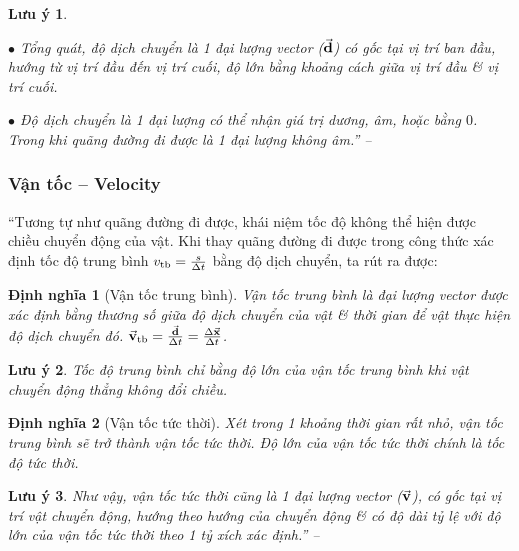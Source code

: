 \documentclass[oneside]{book}
\numberwithin{equation}{section}
\newtheorem{dinhnghia}{Định nghĩa}[section]
\newtheorem{luuy}{Lưu ý}[section]
\begin{document}
\begin{luuy}
	\begin{enumerate*}
		\item[$\bullet$] Tổng quát, độ dịch chuyển là 1 đại lượng vector ($\vec{\bf d}$) có gốc tại vị trí ban đầu, hướng từ vị trí đầu đến vị trí cuối, độ lớn bằng khoảng cách giữa vị trí đầu \& vị trí cuối.
		\item[$\bullet$] Độ dịch chuyển là 1 đại lượng có thể nhận giá trị dương, âm, hoặc bằng $0$. Trong khi quãng đường đi được là 1 đại lượng không âm.'' -- \cite[pp. 26--27]{SGK_Vat_Ly_10_Chan_Troi_Sang_Tao}
	\end{enumerate*}
\end{luuy}

\subsubsection{Vận tốc -- Velocity}
``Tương tự như quãng đường đi được, khái niệm tốc độ không thể hiện được chiều chuyển động của vật. Khi thay quãng đường đi được trong công thức xác định tốc độ trung bình $v_{\rm tb} = \frac{s}{\Delta t}$ bằng độ dịch chuyển, ta rút ra được:

\begin{dinhnghia}[Vận tốc trung bình]
	\emph{Vận tốc trung bình} là đại lượng vector được xác định bằng thương số giữa độ dịch chuyển của vật \& thời gian để vật thực hiện độ dịch chuyển đó. $\vec{\bf v}_{\rm tb} = \frac{\vec{\bf d}}{\Delta t} = \frac{\Delta\vec{\bf x}}{\Delta t}$.
\end{dinhnghia}

\begin{luuy}
	Tốc độ trung bình chỉ bằng độ lớn của vận tốc trung bình khi vật chuyển động thẳng không đổi chiều.
\end{luuy}

\begin{dinhnghia}[Vận tốc tức thời]
	Xét trong 1 khoảng thời gian rất nhỏ, vận tốc trung bình sẽ trở thành \emph{vận tốc tức thời}. Độ lớn của vận tốc tức thời chính là tốc độ tức thời.
\end{dinhnghia}

\begin{luuy}
	Như vậy, vận tốc tức thời cũng là 1 đại lượng vector ($\vec{\bf v}$), có gốc tại vị trí vật chuyển động, hướng theo hướng của chuyển động \& có độ dài tỷ lệ với độ lớn của vận tốc tức thời theo 1 tỷ xích xác định.'' -- \cite[pp. 27--28]{SGK_Vat_Ly_10_Chan_Troi_Sang_Tao}
\end{luuy}
\end{document}
